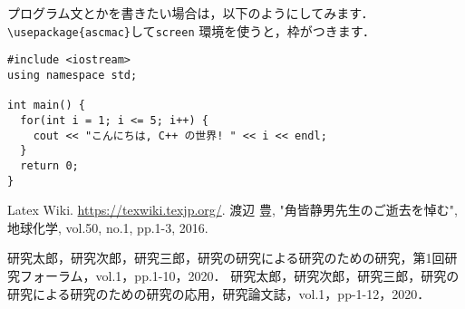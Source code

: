 \documentclass[a4paper,11pt,uplatex]{ujreport}
\begin{document}
プログラム文とかを書きたい場合は，以下のようにしてみます．\verb|\usepackage{ascmac}|して\verb|screen| 環境を使うと，枠がつきます．

\begin{screen}\begin{verbatim}
#include <iostream>
using namespace std;

int main() {
  for(int i = 1; i <= 5; i++) {
    cout << "こんにちは, C++ の世界! " << i << endl;
  }
  return 0;
}
\end{verbatim}\end{screen}

\clearpage

\renewcommand{\bibname}{参考文献}


\begin{thebibliography}{99}
   Latex Wiki. \url{https://texwiki.texjp.org/}.
   渡辺 豊, "角皆静男先生のご逝去を悼む", 地球化学, vol.50, no.1, pp.1-3, 2016.
\end{thebibliography}

% 
% 

\clearpage

\renewcommand{\bibname}{研究業績}


\begin{thebibliography}{99}
  \bibitem{} 研究太郎，研究次郎，研究三郎，研究の研究による研究のための研究，第1回研究フォーラム，vol.1，pp.1-10，2020．
  \bibitem{} 研究太郎，研究次郎，研究三郎，研究の研究による研究のための研究の応用，研究論文誌，vol.1，pp-1-12，2020．
\end{thebibliography}

\clearpage

\end{document}
